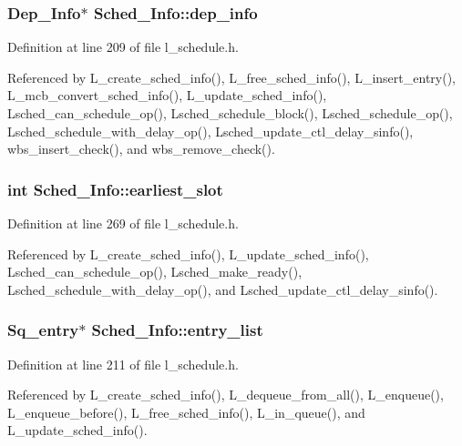 \subsubsection{\setlength{\rightskip}{0pt plus 5cm}\bf{Dep\_\-Info}$\ast$ \bf{Sched\_\-Info::dep\_\-info}}\label{structSched__Info_2b0bd9c90f7e0483241a0af2e89bc74c}




Definition at line 209 of file l\_\-schedule.h.

Referenced by L\_\-create\_\-sched\_\-info(), L\_\-free\_\-sched\_\-info(), L\_\-insert\_\-entry(), L\_\-mcb\_\-convert\_\-sched\_\-info(), L\_\-update\_\-sched\_\-info(), Lsched\_\-can\_\-schedule\_\-op(), Lsched\_\-schedule\_\-block(), Lsched\_\-schedule\_\-op(), Lsched\_\-schedule\_\-with\_\-delay\_\-op(), Lsched\_\-update\_\-ctl\_\-delay\_\-sinfo(), wbs\_\-insert\_\-check(), and wbs\_\-remove\_\-check().
\subsubsection{\setlength{\rightskip}{0pt plus 5cm}int \bf{Sched\_\-Info::earliest\_\-slot}}\label{structSched__Info_65160cab01d2693b03cb1dda2b3017b4}




Definition at line 269 of file l\_\-schedule.h.

Referenced by L\_\-create\_\-sched\_\-info(), L\_\-update\_\-sched\_\-info(), Lsched\_\-can\_\-schedule\_\-op(), Lsched\_\-make\_\-ready(), Lsched\_\-schedule\_\-with\_\-delay\_\-op(), and Lsched\_\-update\_\-ctl\_\-delay\_\-sinfo().
\subsubsection{\setlength{\rightskip}{0pt plus 5cm}\bf{Sq\_\-entry}$\ast$ \bf{Sched\_\-Info::entry\_\-list}}\label{structSched__Info_349f3d661fbe9ed459640b48073aece8}




Definition at line 211 of file l\_\-schedule.h.

Referenced by L\_\-create\_\-sched\_\-info(), L\_\-dequeue\_\-from\_\-all(), L\_\-enqueue(), L\_\-enqueue\_\-before(), L\_\-free\_\-sched\_\-info(), L\_\-in\_\-queue(), and L\_\-update\_\-sched\_\-info().
